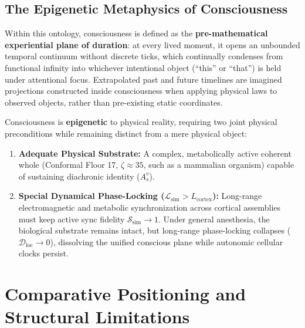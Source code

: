 \documentclass[11pt,a4paper]{article}
\begin{document}
\subsection{The Epigenetic Metaphysics of Consciousness}
Within this ontology, consciousness is defined as the \textbf{pre-mathematical experiential plane of duration}: at every lived moment, it opens an unbounded temporal continuum without discrete ticks, which continually condenses from functional infinity into whichever intentional object (``this'' or ``that'') is held under attentional focus. Extrapolated past and future timelines are imagined projections constructed inside consciousness when applying physical laws to observed objects, rather than pre-existing static coordinates.

Consciousness is \textbf{epigenetic} to physical reality, requiring two joint physical preconditions while remaining distinct from a mere physical object:
\begin{enumerate}[leftmargin=1.5em]
    \item \textbf{Adequate Physical Substrate:} A complex, metabolically active coherent whole (Conformal Floor 17, $\zeta \approx 35$, such as a mammalian organism) capable of sustaining diachronic identity ($A_s^v$).
    \item \textbf{Special Dynamical Phase-Locking ($\mathcal{L}_{\text{sim}} > L_{\text{cortex}}$):} Long-range electromagnetic and metabolic synchronization across cortical assemblies must keep active sync fidelity $\mathcal{S}_{\text{sim}} \to 1$. Under general anesthesia, the biological substrate remains intact, but long-range phase-locking collapses ($\mathcal{D}_{\text{loc}} \to 0$), dissolving the unified conscious plane while autonomic cellular clocks persist.
\end{enumerate}

\section{Comparative Positioning and Structural Limitations}
\end{document}
